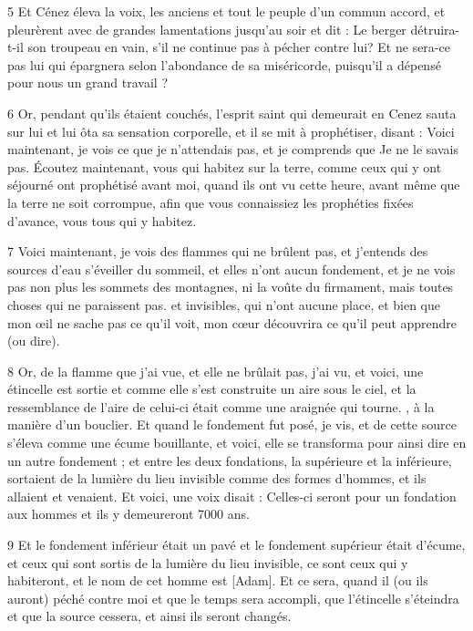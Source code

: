 \par 5 Et Cénez éleva la voix, les anciens et tout le peuple d'un commun accord, et pleurèrent avec de grandes lamentations jusqu'au soir et dit : Le berger détruira-t-il son troupeau en vain, s'il ne continue pas à pécher contre lui? Et ne sera-ce pas lui qui épargnera selon l'abondance de sa miséricorde, puisqu'il a dépensé pour nous un grand travail ?

\par 6 Or, pendant qu'ils étaient couchés, l'esprit saint qui demeurait en Cenez sauta sur lui et lui ôta sa sensation corporelle, et il se mit à prophétiser, disant : Voici maintenant, je vois ce que je n'attendais pas, et je comprends que Je ne le savais pas. Écoutez maintenant, vous qui habitez sur la terre, comme ceux qui y ont séjourné ont prophétisé avant moi, quand ils ont vu cette heure, avant même que la terre ne soit corrompue, afin que vous connaissiez les prophéties fixées d'avance, vous tous qui y habitez.

\par 7 Voici maintenant, je vois des flammes qui ne brûlent pas, et j'entends des sources d'eau s'éveiller du sommeil, et elles n'ont aucun fondement, et je ne vois pas non plus les sommets des montagnes, ni la voûte du firmament, mais toutes choses qui ne paraissent pas. et invisibles, qui n'ont aucune place, et bien que mon œil ne sache pas ce qu'il voit, mon cœur découvrira ce qu'il peut apprendre (ou dire).

\par 8 Or, de la flamme que j'ai vue, et elle ne brûlait pas, j'ai vu, et voici, une étincelle est sortie et comme elle s'est construite un aire sous le ciel, et la ressemblance de l'aire de celui-ci était comme une araignée qui tourne. , à la manière d'un bouclier. Et quand le fondement fut posé, je vis, et de cette source s'éleva comme une écume bouillante, et voici, elle se transforma pour ainsi dire en un autre fondement ; et entre les deux fondations, la supérieure et la inférieure, sortaient de la lumière du lieu invisible comme des formes d'hommes, et ils allaient et venaient. Et voici, une voix disait : Celles-ci seront pour un fondation aux hommes et ils y demeureront 7000 ans.

\par 9 Et le fondement inférieur était un pavé et le fondement supérieur était d'écume, et ceux qui sont sortis de la lumière du lieu invisible, ce sont ceux qui y habiteront, et le nom de cet homme est [Adam]. Et ce sera, quand il (ou ils auront) péché contre moi et que le temps sera accompli, que l'étincelle s'éteindra et que la source cessera, et ainsi ils seront changés.

